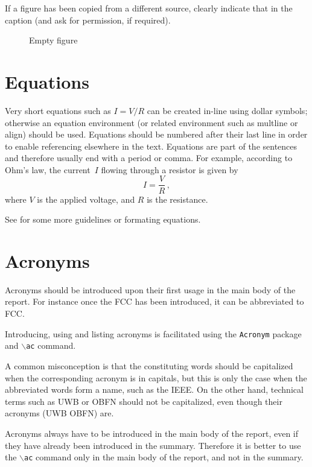 If a figure has been copied from a different source, clearly indicate that in the caption (and ask for permission, if required). 

\begin{figure}
\caption{Empty figure}\label{fig_empty}
\end{figure}

\section{Equations}
\label{sec:equation}
Very short equations such as $I=V/R$ can be created in-line using dollar symbols; otherwise an equation environment (or related environment such as multline or align) should be used. Equations should be numbered after their last line in order to enable referencing elsewhere in the text. Equations are part of the sentences and therefore usually end with a period or comma. For example, according to Ohm's law, the current~$I$ flowing through a resistor is given by
\begin{equation}
I=\frac{V}{R}\,,
\end{equation}
where $V$ is the applied voltage, and $R$ is the resistance.

See  for some more guidelines or formating equations.

\section{Acronyms}
\label{sec:acronyms}
Acronyms should be introduced upon their first usage in the main body of the report. For instance once the \ac{FCC} has been introduced, it can be abbreviated to \ac{FCC}.

Introducing, using and listing acronyms is facilitated using the \texttt{Acronym} package and \texttt{$\backslash$ac} command. 

A common misconception is that the constituting words should be capitalized when the corresponding acronym is in capitals, but this is only the case when the abbreviated words form a name, such as the \ac{IEEE}. On the other hand, technical terms such as \ac{UWB} or \ac{OBFN} should not be capitalized, even though their acronyms (\ac{UWB} \ac{OBFN}) are. 

Acronyms always have to be introduced in the main body of the report, even if they have already been introduced in the summary. Therefore it is better to use the \texttt{$\backslash$ac} command only in the main body of the report, and not in the summary.

